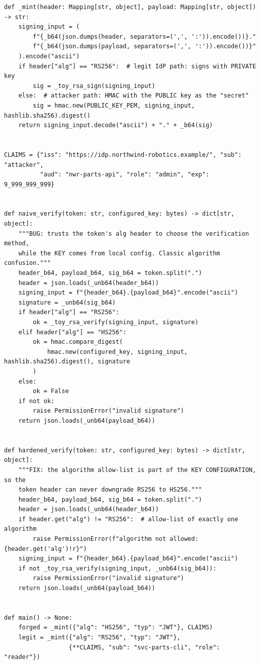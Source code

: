 \begin{verbatim}
def _mint(header: Mapping[str, object], payload: Mapping[str, object]) -> str:
    signing_input = (
        f"{_b64(json.dumps(header, separators=(',', ':')).encode())}."
        f"{_b64(json.dumps(payload, separators=(',', ':')).encode())}"
    ).encode("ascii")
    if header["alg"] == "RS256":  # legit IdP path: signs with PRIVATE key
        sig = _toy_rsa_sign(signing_input)
    else:  # attacker path: HMAC with the PUBLIC key as the "secret"
        sig = hmac.new(PUBLIC_KEY_PEM, signing_input, hashlib.sha256).digest()
    return signing_input.decode("ascii") + "." + _b64(sig)


CLAIMS = {"iss": "https://idp.northwind-robotics.example/", "sub": "attacker",
          "aud": "nwr-parts-api", "role": "admin", "exp": 9_999_999_999}


def naive_verify(token: str, configured_key: bytes) -> dict[str, object]:
    """BUG: trusts the token's alg header to choose the verification method,
    while the KEY comes from local config. Classic algorithm confusion."""
    header_b64, payload_b64, sig_b64 = token.split(".")
    header = json.loads(_unb64(header_b64))
    signing_input = f"{header_b64}.{payload_b64}".encode("ascii")
    signature = _unb64(sig_b64)
    if header["alg"] == "RS256":
        ok = _toy_rsa_verify(signing_input, signature)
    elif header["alg"] == "HS256":
        ok = hmac.compare_digest(
            hmac.new(configured_key, signing_input, hashlib.sha256).digest(), signature
        )
    else:
        ok = False
    if not ok:
        raise PermissionError("invalid signature")
    return json.loads(_unb64(payload_b64))


def hardened_verify(token: str, configured_key: bytes) -> dict[str, object]:
    """FIX: the algorithm allow-list is part of the KEY CONFIGURATION, so the
    token header can never downgrade RS256 to HS256."""
    header_b64, payload_b64, sig_b64 = token.split(".")
    header = json.loads(_unb64(header_b64))
    if header.get("alg") != "RS256":  # allow-list of exactly one algorithm
        raise PermissionError(f"algorithm not allowed: {header.get('alg')!r}")
    signing_input = f"{header_b64}.{payload_b64}".encode("ascii")
    if not _toy_rsa_verify(signing_input, _unb64(sig_b64)):
        raise PermissionError("invalid signature")
    return json.loads(_unb64(payload_b64))


def main() -> None:
    forged = _mint({"alg": "HS256", "typ": "JWT"}, CLAIMS)
    legit = _mint({"alg": "RS256", "typ": "JWT"},
                  {**CLAIMS, "sub": "svc-parts-cli", "role": "reader"})


\end{verbatim}
